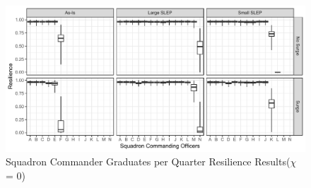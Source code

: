 \documentclass[preprint,12pt]{elsarticle}
\begin{document}
\begin{figure}[h]
  \begin{center}
  \includegraphics[width=5in]{CO_Grad}
  \caption{Squadron Commander Graduates per Quarter Resilience
    Results($\chi$ = 0)
  \label{f:CO_Grad}}
  \end{center}
\end{figure}
\end{document}
